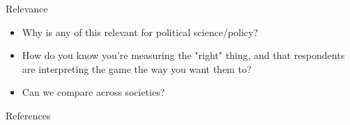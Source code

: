 \documentclass[xcolor={dvipsnames},handout]{beamer}
\begin{document}

\begin{frame}{Relevance}

\begin{itemize}
\item Why is any of this relevant for political science/policy? 
\item How do you know you're measuring the "right" thing, and that respondents are interpreting the game the way you want them to?
\item Can we compare across societies?
\end{itemize}

\end{frame}



\backupbegin

\begin{frame}[allowframebreaks]{References}
    
    
\end{frame}
\backupend
\end{document}
